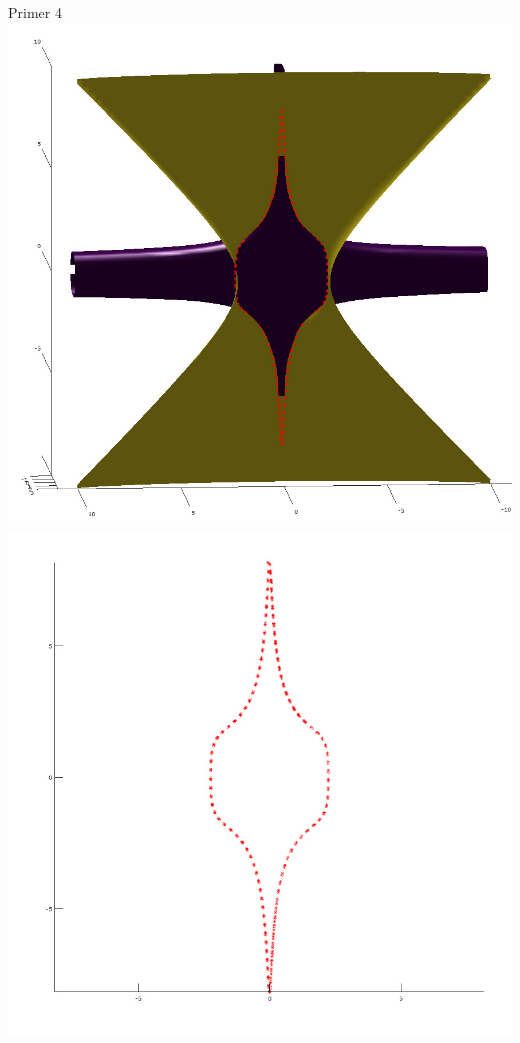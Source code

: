 \documentclass{beamer}
\begin{document}
	\begin{frame}{Primer 4}
		\includegraphics[scale=0.3]{primer4_2}
		\includegraphics[scale=0.3]{primer4_3}
	\end{frame}
	
\end{document}
